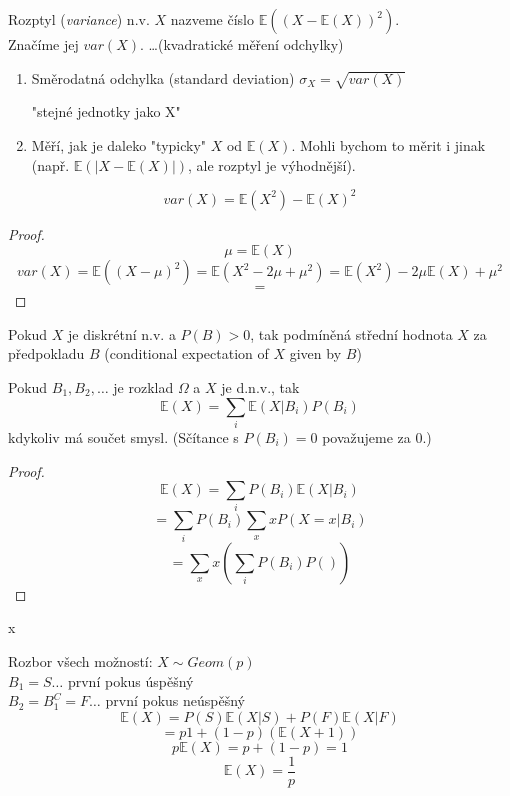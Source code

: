 \documentclass[../main.tex]{subfiles}
\begin{document}
\begin{definition}[Rozptyl]
    Rozptyl (\textit{variance}) n.v. $X$ nazveme číslo $\mathbb{E}((X-\mathbb{E}(X))^2)$.\\
    Značíme jej $var(X)$. \dots (kvadratické měření odchylky)
    \begin{enumerate}
        \item Směrodatná odchylka (standard deviation) $\sigma_X = \sqrt{var(X)}$
        \begin{remark}
            "stejné jednotky jako X"
        \end{remark}
        \item Měří, jak je daleko "typicky" $X$ od $\mathbb{E}(X)$. Mohli bychom to měrit i jinak 
        (např. $\mathbb{E}(|X-\mathbb{E}(X)|)$, ale rozptyl je výhodnější).
    \end{enumerate}
\end{definition}

\begin{theorem}
    \[var(X) = \mathbb{E}(X^2) - \mathbb{E}(X)^2\]
\end{theorem}
\begin{proof}
    \[\mu = \mathbb{E}(X)\]
    \[var(X) = \mathbb{E}((X - \mu)^2) = \mathbb{E}(X^2-2\mu + \mu^2) = \mathbb{E}(X^2) - 2\mu \mathbb{E}(X) + \mu^2\]
    \[ = \]
\end{proof}

\begin{definition}
    Pokud $X$ je diskrétní n.v. a $P(B) > 0$, tak podmíněná střední hodnota 
    $X$ za předpokladu $B$ (conditional expectation of $X$ given by $B$)
\end{definition}

\begin{theorem}
    Pokud $B_1,B_2,\dots$ je rozklad $\Omega$ a $X$ je d.n.v., tak
    \[\mathbb{E}(X) = \sum_i \mathbb{E}(X | B_i) P(B_i)\]
    kdykoliv má součet smysl. (Sčítance s $P(B_i) = 0$ považujeme za 0.)
\end{theorem}
\begin{proof}
    \[\mathbb{E}(X) = \sum_i P(B_i)\mathbb{E}(X | B_i)\]
    \[= \sum_i P(B_i) \sum_x xP(X=x | B_i)\]
    \[= \sum_x x (\sum_i P(B_i)P())\]
\end{proof}

\begin{remark} {\color{white} x}

    \noindent
    Rozbor všech možností:
    $X \sim Geom(p)$\\
    $B_1 = S \dots$ první pokus úspěšný\\
    $B_2 = B^C_1 = F \dots$ první pokus neúspěšný\\
    \[\mathbb{E}(X) = P(S)\mathbb{E}(X|S) + P(F)\mathbb{E}(X|F)\]
    \[= p1 + (1-p)(\mathbb{E}(X+1))\]
    \[p\mathbb{E}(X) = p + (1-p) = 1\]
    \[\mathbb{E}(X) = \frac{1}{p}\]
\end{remark}
\end{document}
